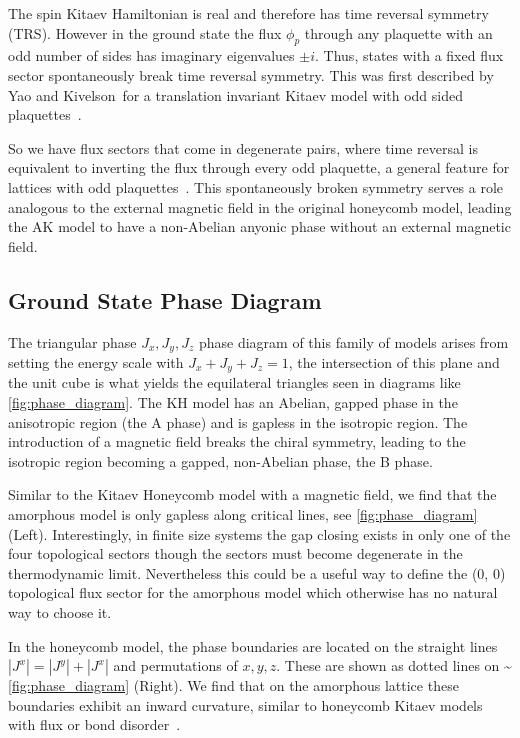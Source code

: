 The spin Kitaev Hamiltonian is real and therefore has time reversal symmetry (TRS). However in the ground state the flux \(\phi_p\) through any plaquette with an odd number of sides has imaginary eigenvalues \(\pm i\). Thus, states with a fixed flux sector spontaneously break time reversal symmetry. This was first described by Yao and Kivelson~for a translation invariant Kitaev model with odd sided plaquettes~\autocite{Yao2011}.

So we have flux sectors that come in degenerate pairs, where time reversal is equivalent to inverting the flux through every odd plaquette, a general feature for lattices with odd plaquettes~\autocite{yaoExactChiralSpin2007,Peri2020}. This spontaneously broken symmetry serves a role analogous to the external magnetic field in the original honeycomb model, leading the AK model to have a non-Abelian anyonic phase without an external magnetic field.

\hypertarget{ground-state-phase-diagram}{%
\subsection{Ground State Phase Diagram}\label{ground-state-phase-diagram}}

The triangular phase \(J_x, J_y, J_z\) phase diagram of this family of models arises from setting the energy scale with \(J_x + J_y + J_z = 1\), the intersection of this plane and the unit cube is what yields the equilateral triangles seen in diagrams like \cref{fig:phase_diagram}. The KH model has an Abelian, gapped phase in the anisotropic region (the A phase) and is gapless in the isotropic region. The introduction of a magnetic field breaks the chiral symmetry, leading to the isotropic region becoming a gapped, non-Abelian phase, the B phase.

Similar to the Kitaev Honeycomb model with a magnetic field, we find that the amorphous model is only gapless along critical lines, see \cref{fig:phase_diagram} (Left). Interestingly, in finite size systems the gap closing exists in only one of the four topological sectors though the sectors must become degenerate in the thermodynamic limit. Nevertheless this could be a useful way to define the (0, 0) topological flux sector for the amorphous model which otherwise has no natural way to choose it.

In the honeycomb model, the phase boundaries are located on the straight lines \(|J^x| = |J^y| + |J^x|\) and permutations of \(x,y,z\). These are shown as dotted lines on \textasciitilde{}\cref{fig:phase_diagram} (Right). We find that on the amorphous lattice these boundaries exhibit an inward curvature, similar to honeycomb Kitaev models with flux or bond disorder~\autocite{knolle_dynamics_2016,Nasu_Thermal_2015,lahtinenPerturbedVortexLattices2014,willansDisorderQuantumSpin2010,zschockePhysicalStatesFinitesize2015,kaoDisorderDisorderLocalization2021}.

